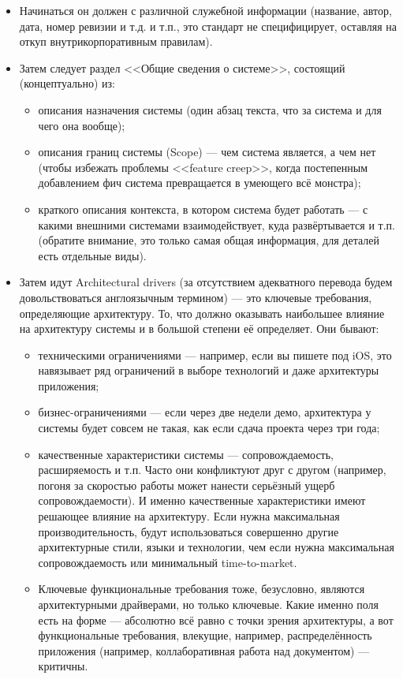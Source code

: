 \documentclass[a5paper]{article}
\begin{document}
\begin{itemize}
    \item Начинаться он должен с различной служебной информации (название, автор, дата, номер ревизии и т.д. и т.п., это стандарт не специфицирует, оставляя на откуп внутрикорпоративным правилам).
    \item Затем следует раздел <<Общие сведения о системе>>, состоящий (концептуально) из:
        \begin{itemize}
            \item описания назначения системы (один абзац текста, что за система и для чего она вообще);
            \item описания границ системы (Scope) --- чем система является, а чем нет (чтобы избежать проблемы <<feature creep>>, когда постепенным добавлением фич система превращается в умеющего всё монстра);
            \item краткого описания контекста, в котором система будет работать --- с какими внешними системами взаимодействует, куда развёртывается и т.п. (обратите внимание, это только самая общая информация, для деталей есть отдельные виды).
        \end{itemize}
    \item Затем идут Architectural drivers (за отсутствием адекватного перевода будем довольствоваться англоязычным термином) --- это ключевые требования, определяющие архитектуру. То, что должно оказывать наибольшее влияние на архитектуру системы и в большой степени её определяет. Они бывают:
        \begin{itemize}
            \item техническими ограничениями --- например, если вы пишете под iOS, это навязывает ряд ограничений в выборе технологий и даже архитектуры приложения;
            \item бизнес-ограничениями --- если через две недели демо, архитектура у системы будет совсем не такая, как если сдача проекта через три года;
            \item качественные характеристики системы --- сопровождаемость, расширяемость и т.п. Часто они конфликтуют друг с другом (например, погоня за скоростью работы может нанести серьёзный ущерб сопровождаемости). И именно качественные характеристики имеют решающее влияние на архитектуру. Если нужна максимальная производительность, будут использоваться совершенно другие архитектурные стили, языки и технологии, чем если нужна максимальная сопровождаемость или минимальный time-to-market.
            \item Ключевые функциональные требования тоже, безусловно, являются архитектурными драйверами, но только ключевые. Какие именно поля есть на форме --- абсолютно всё равно с точки зрения архитектуры, а вот функциональные требования, влекущие, например, распределённость приложения (например, коллаборативная работа над документом) --- критичны.

\end{itemize}
\end{itemize}
\end{document}
